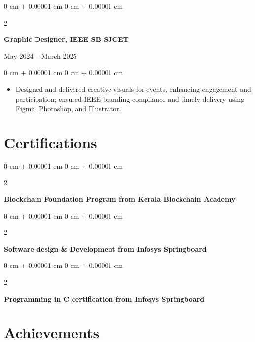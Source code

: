 \documentclass[10pt, a4paper]{article}
\newenvironment{highlights}{
    \begin{itemize}[
        topsep=0.10 cm,
        parsep=0.10 cm,
        partopsep=0pt,
        itemsep=0pt,
        leftmargin=0 cm + 10pt
    ]
}{
    \end{itemize}
} %
\newenvironment{onecolentry}{
    \begin{adjustwidth}{
        0 cm + 0.00001 cm
    }{
        0 cm + 0.00001 cm
    }
}{
    \end{adjustwidth}
} %
\newenvironment{twocolentry}[2][]{
    \onecolentry
    \def\secondColumn{#2}
    \setcolumnwidth{\fill, 4.5 cm}
    \begin{paracol}{2}
}{
    \switchcolumn \raggedleft \secondColumn
    \end{paracol}
    \endonecolentry
} %
\begin{document}
\vspace{0.2 cm}

\begin{twocolentry}{
    May 2024 – March 2025
}
    \textbf{Graphic Designer, IEEE SB SJCET}
\end{twocolentry}

\vspace{0.10 cm}
\begin{onecolentry}
    \begin{highlights}
        \item Designed and delivered creative visuals for events, enhancing engagement and participation; ensured IEEE branding compliance and timely delivery using Figma, Photoshop, and Illustrator.
    \end{highlights}
\end{onecolentry}
    
    \section{Certifications}
    
        \begin{samepage}  
            \begin{twocolentry}{
            }
                \textbf{Blockchain Foundation Program from Kerala Blockchain Academy}
                \end{twocolentry}
                
            \begin{twocolentry}{
            }
                \textbf{Software design \& Development from Infosys Springboard}
                \end{twocolentry}
        \end{samepage}

        \begin{twocolentry}{
            }
                \textbf{Programming in C certification from Infosys Springboard}
                \end{twocolentry}

\vspace{0.20 cm}

    \section{Achievements}
    
\end{document}
